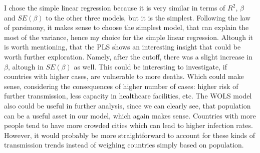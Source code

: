 \documentclass[
]{article}
\begin{document}
I chose the simple linear regression because it is very similar in terms
of \(R^2\), \(\beta\) and \(SE(\beta)\) to the other three models, but
it is the simplest. Following the law of parsimony, it makes sense to
choose the simplest model, that can explain the most of the variance,
hence my choice for the simple linear regression. Altough it is worth
mentioning, that the PLS shows an interesting insight that could be
worth further exploration. Namely, after the cutoff, there was a slight
increase in \(\beta\), altough in \(SE(\beta)\) as well. This could be
interesting to investigate, if countries with higher cases, are
vulnerable to more deaths. Which could make sense, considering the
consequences of higher number of cases: higher risk of further
transmission, less capacity in healthcare facilities, etc. The WOLS
model also could be useful in further analysis, since we can clearly
see, that population can be a useful asset in our model, which again
makes sense. Countries with more people tend to have more crowded cities
which can lead to higher infection rates. However, it would probably be
more straightforward to account for these kinds of transmission trends
instead of weighing countries simply based on population.
\end{document}
